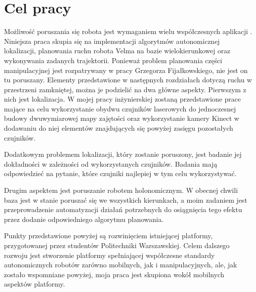 \section{Cel pracy}

Możliwość poruszania się robota jest wymaganiem wielu współczesnych aplikacji \cite{auto_slam}.  
Niniejsza praca skupia się na implementacji algorytmów autonomicznej lokalizacji, planowania ruchu robota Velma na bazie wielokierunkowej oraz wykonywania zadanych trajektorii. 
Ponieważ problem planowania części manipulacyjnej jest rozpatrywany w pracy Grzegorza Fijałkowskiego, nie jest on tu poruszany.
Elementy przedstawione w następnych rozdziałach dotyczą ruchu w przestrzeni zamkniętej, można je podzielić na dwa główne aspekty.
Pierwszym z nich jest lokalizacja.
W mojej pracy inżynierskiej zostaną przedstawione prace mające na celu wykorzystanie obydwu czujników laserowych do jednoczesnej budowy dwuwymiarowej mapy zajętości oraz wykorzystanie kamery Kinect w dodawaniu do niej elementów znajdujących się powyżej zasięgu pozostałych czujników. 

Dodatkowym problemem lokalizacji, który zostanie poruszony, jest badanie jej dokładności w zależności od wykorzystanych czujników.
Badania mają odpowiedzieć na pytanie, które czujniki najlepiej w tym celu wykorzystywać.

Drugim aspektem jest poruszanie robotem holonomicznym. W obecnej chwili baza jest w stanie poruszać się we wszystkich kierunkach, a moim zadaniem jest przeprowadzenie automatyzacji działań potrzebnych do osiągnięcia tego efektu przez dodanie odpowiedniego algorytmu planowania.

Punkty przedstawione powyżej są rozwinięciem istniejącej platformy, przygotowanej przez studentów Politechniki Warszawskiej.
Celem dalszego rozwoju jest stworzenie platformy spełniającej współczesne standardy autonomicznych robotów zarówno mobilnych, jak i manipulacyjnych, ale, jak zostało wspomniane powyżej, moja praca jest skupiona wokół mobilnych aspektów platformy.
